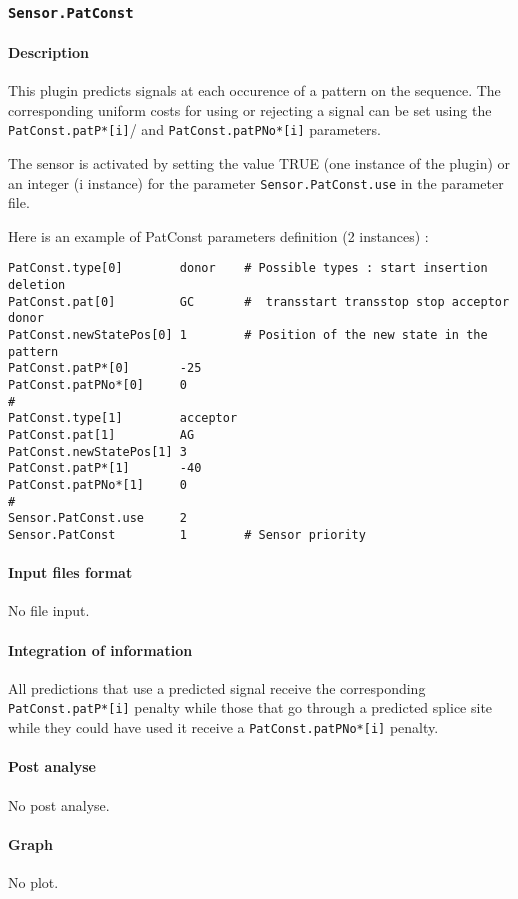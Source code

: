 
\subsubsection{\texttt{Sensor.PatConst}}

\paragraph{Description}

This plugin predicts signals at each occurence of a pattern on the
sequence. The corresponding uniform costs for using
or rejecting a signal can be set using the
\texttt{PatConst.patP*[i]}/ and \texttt{PatConst.patPNo*[i]} parameters.

The sensor is activated by setting the value TRUE (one instance of the
plugin) or an integer (i instance) for the parameter
\texttt{Sensor.PatConst.use} in the parameter file.

Here is an example of PatConst parameters definition (2 instances) :
\begin{Verbatim}[fontsize=\small]
PatConst.type[0]        donor    # Possible types : start insertion deletion
PatConst.pat[0]         GC       #  transstart transstop stop acceptor donor
PatConst.newStatePos[0] 1        # Position of the new state in the pattern
PatConst.patP*[0]       -25
PatConst.patPNo*[0]     0
#
PatConst.type[1]        acceptor
PatConst.pat[1]         AG   
PatConst.newStatePos[1] 3
PatConst.patP*[1]       -40
PatConst.patPNo*[1]     0
#
Sensor.PatConst.use     2
Sensor.PatConst         1        # Sensor priority
\end{Verbatim}

\paragraph{Input files format}

No file input.

\paragraph{Integration of information}

All predictions that use a predicted signal receive the
corresponding \texttt{PatConst\-.patP*[i]} penalty while those that go through
a predicted splice site while they could have used it receive a
\texttt{PatConst.patPNo*[i]} penalty.

\paragraph{Post analyse}

No post analyse.

\paragraph{Graph}

No plot.
